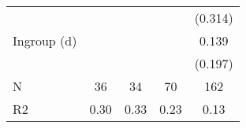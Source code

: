 {\begin{tabular}{l*{4}{c}}
                    &                     &                     &                     &     (0.314)         \\
[1em]
Ingroup (d)         &                     &                     &                     &       0.139         \\
                    &                     &                     &                     &     (0.197)         \\
\hline
N                   &          36         &          34         &          70         &         162         \\
R2                  &        0.30         &        0.33         &        0.23         &        0.13         \\
\hline\hline
\end{tabular}
}
